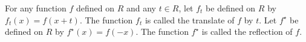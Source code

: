 For any function $f$ defined on $R$ and any $t \in R$, let $f_t$ be defined on $R$ by $f_t(x) = f(x + t)$. The function $f_t$ is called the translate of $f$ by $t$. Let $f^{\star}$ be defined on $R$ by $f^{\star}(x) = f(-x)$. The function $f^{\star}$ is called the reflection of $f$.